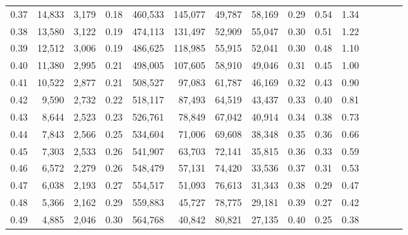 \begin{tabular}{rrrcrrrrrrrrrrr}
0.37 &  14,833 &  3,179 &                                       0.18 &  460,533 &  145,077 &   49,787 &   58,169 &  0.29 &  0.54 &                         1.34 \\
0.38 &  13,580 &  3,122 &                                       0.19 &  474,113 &  131,497 &   52,909 &   55,047 &  0.30 &  0.51 &                         1.22 \\
0.39 &  12,512 &  3,006 &                                       0.19 &  486,625 &  118,985 &   55,915 &   52,041 &  0.30 &  0.48 &                         1.10 \\
0.40 &  11,380 &  2,995 &                                       0.21 &  498,005 &  107,605 &   58,910 &   49,046 &  0.31 &  0.45 &                         1.00 \\
0.41 &  10,522 &  2,877 &                                       0.21 &  508,527 &   97,083 &   61,787 &   46,169 &  0.32 &  0.43 &                         0.90 \\
0.42 &   9,590 &  2,732 &                                       0.22 &  518,117 &   87,493 &   64,519 &   43,437 &  0.33 &  0.40 &                         0.81 \\
0.43 &   8,644 &  2,523 &                                       0.23 &  526,761 &   78,849 &   67,042 &   40,914 &  0.34 &  0.38 &                         0.73 \\
0.44 &   7,843 &  2,566 &                                       0.25 &  534,604 &   71,006 &   69,608 &   38,348 &  0.35 &  0.36 &                         0.66 \\
0.45 &   7,303 &  2,533 &                                       0.26 &  541,907 &   63,703 &   72,141 &   35,815 &  0.36 &  0.33 &                         0.59 \\
0.46 &   6,572 &  2,279 &                                       0.26 &  548,479 &   57,131 &   74,420 &   33,536 &  0.37 &  0.31 &                         0.53 \\
0.47 &   6,038 &  2,193 &                                       0.27 &  554,517 &   51,093 &   76,613 &   31,343 &  0.38 &  0.29 &                         0.47 \\
0.48 &   5,366 &  2,162 &                                       0.29 &  559,883 &   45,727 &   78,775 &   29,181 &  0.39 &  0.27 &                         0.42 \\
0.49 &   4,885 &  2,046 &                                       0.30 &  564,768 &   40,842 &   80,821 &   27,135 &  0.40 &  0.25 &                         0.38 \\

\end{tabular}
